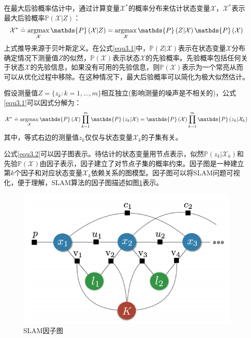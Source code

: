 在最大后验概率估计中，通过计算变量$\mathcal{X}^*$的概率分布来估计状态变量$\mathcal{X}$，$\mathcal{X}^*$表示最大后验概率$\mathds{P}\left(\mathcal{X} \vert Z\right)$：
\begin{equation}
\label{equ3.1}
\mathcal{X}^* 
\doteq 
\argmax \limits_{\mathcal{X}} \mathds{P}\left(\mathcal{X} \vert Z\right) 
=
\argmax \limits_{\mathcal{X}}\mathds{P}\left(Z \vert \mathcal{X}  \right)\mathds{P}\left(\mathcal{X}\right)
\end{equation}
上式推导来源于贝叶斯定义。在公式\eqref{equ3.1}中，$\mathds{P}\left(Z \vert \mathcal{X}  \right)$表示在状态变量$\mathcal{X}$分布确定情况下测量值$Z$的似然，$\mathds{P}\left(\mathcal{X}\right)$表示状态$\mathcal{X}$的先验概率。先验概率包括任何关于状态$\mathcal{X}$的先验信息，如果没有可用的先验信息，则$\mathds{P}\left(\mathcal{X}\right)$表示为一个常亮从而可以从优化过程中移除。在这种情况下，最大后验概率可以简化为极大似然估计。

假设测量值$Z=\lbrace z_k:k=1,\ldots ,m\rbrace$相互独立(影响测量的噪声是不相关的)，公式\eqref{equ3.1}可以因式分解为：
\begin{equation}
\label{equ3.2}
\mathcal{X}^* 
\doteq 
\argmax \limits_{\mathcal{X}} \mathds{P}\left(\mathcal{X}\right) \prod \limits_{k=1}^{m} \mathds{P}\left(z_k \vert \mathcal{X}  \right)
=
\mathds{P}\left(\mathcal{X}\right) \prod \limits_{k=1}^{m} \mathds{P}\left(z_k \vert \mathcal{X}_k  \right)
\end{equation}
其中，等式右边的测量值$z_k$仅仅与状态变量$\mathcal{X}_k$的子集有关。

公式\eqref{equ3.2}可以因子图表示。待估计的状态变量用节点表示，似然$\mathds{P}\left(z_k \vert \mathcal{X}_k  \right)$和先验$\mathds{P}\left(\mathcal{X} \right)$由因子表示，因子建立了对节点子集的概率约束。因子图是一种建立第$k$个因子和对应状态变量$\mathcal{X}_k$依赖关系的图模型。因子图可以将SLAM问题可视化，便于理解，SLAM算法的因子图描述如图\ref{fig3.3}表示。
\begin{figure}
\centering
\includegraphics[scale=0.5]{figures/Fig3.3.png}
\caption{SLAM因子图}
\label{fig3.3}
\end{figure}


